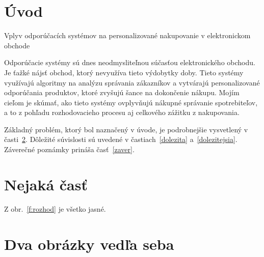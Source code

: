 \documentclass[10pt,twocolumn,twoside,slovak,a4paper]{article}
\author{
\begin{minipage}[t]{0.5\textwidth}
    \vspace{-2ex} 
    \texttt{[image: fiit.png]}
\end{minipage}
\begin{minipage}[t]{0.85\textwidth}
    \vspace{-2ex}
    Roman Dunko\\[2pt]
	{\small Slovenská technická univerzita v Bratislave}\\
	{\small Fakulta informatiky a informačných technológií}\\
	{\small \texttt{xdunko@stuba.sk}}
\end{minipage}
}
\date{\small 10. október 2024}
\begin{document}
\maketitle

\begin{abstract}
\ldots
\end{abstract}

\section{Úvod}
Vplyv odporúčacích systémov na personalizované nakupovanie v elektronickom obchode

Odporúčacie systémy sú dnes neodmysliteľnou súčasťou elektronického obchodu. Je ťažké nájsť obchod, ktorý nevyužíva tieto výdobytky doby. Tieto systémy využívajú algoritmy na analýzu správania zákazníkov a vytvárajú personalizované odporúčania produktov, ktoré zvyšujú šance na dokončenie nákupu. Mojím cieľom je skúmať, ako tieto systémy ovplyvňujú nákupné správanie spotrebiteľov, a to z pohľadu rozhodovacieho procesu aj celkového zážitku z nakupovania.

Základný problém, ktorý bol naznačený v úvode, je podrobnejšie vysvetlený v časti~\ref{nejaka}.
Dôležité súvislosti sú uvedené v častiach~\ref{dolezita} a~\ref{dolezitejsia}.
Záverečné poznámky prináša časť~\ref{zaver}.

\section{Nejaká časť} \label{nejaka}

Z obr.~\ref{f:rozhod} je všetko jasné. 



\section{Dva obrázky vedľa seba}
\end{document}
